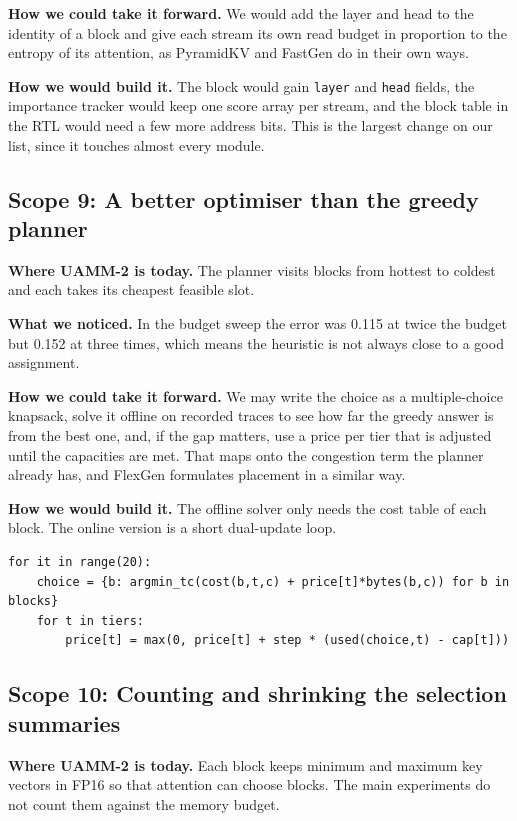 \documentclass[12pt,a4paper]{report}
\begin{document}
\textbf{How we could take it forward.} We would add the layer and head to the identity of a block and give each stream its own read budget in proportion to the entropy of its attention, as PyramidKV and FastGen do in their own ways.

\textbf{How we would build it.} The block would gain \texttt{layer} and \texttt{head} fields, the importance tracker would keep one score array per stream, and the block table in the RTL would need a few more address bits. This is the largest change on our list, since it touches almost every module.

\subsection{Scope 9: A better optimiser than the greedy planner}
\textbf{Where UAMM-2 is today.} The planner visits blocks from hottest to coldest and each takes its cheapest feasible slot.

\textbf{What we noticed.} In the budget sweep the error was 0.115 at twice the budget but 0.152 at three times, which means the heuristic is not always close to a good assignment.

\textbf{How we could take it forward.} We may write the choice as a multiple-choice knapsack, solve it offline on recorded traces to see how far the greedy answer is from the best one, and, if the gap matters, use a price per tier that is adjusted until the capacities are met. That maps onto the congestion term the planner already has, and FlexGen formulates placement in a similar way.

\textbf{How we would build it.} The offline solver only needs the cost table of each block. The online version is a short dual-update loop.

\begin{lstlisting}
for it in range(20):
    choice = {b: argmin_tc(cost(b,t,c) + price[t]*bytes(b,c)) for b in blocks}
    for t in tiers:
        price[t] = max(0, price[t] + step * (used(choice,t) - cap[t]))
\end{lstlisting}
\subsection{Scope 10: Counting and shrinking the selection summaries}
\textbf{Where UAMM-2 is today.} Each block keeps minimum and maximum key vectors in FP16 so that attention can choose blocks. The main experiments do not count them against the memory budget.
\end{document}
